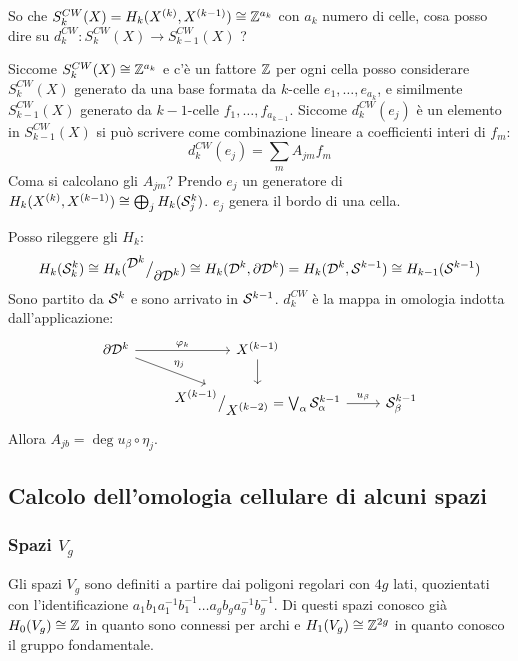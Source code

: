 \begin{osservation}
  So che $ S_k^{CW}(X) = H_k(X^{(k)}, X^{(k-1)}) \cong \mathbb{Z}^{a_k} $ con $ a_k $ numero di celle,
  cosa posso dire su $ d_k^{CW} \colon S_k^{CW}(X) \to S_{k-1}^{CW}(X) $ ?

  Siccome $ S_k^{CW}(X) \cong \mathbb{Z}^{a_k} $ e c'è un fattore $ \mathbb{Z} $ per ogni cella
  posso considerare $ S_k^{CW}(X) $ generato da una base formata da
  $ k $-celle $ e_1, \dots, e_{a_k} $, e similmente $ S_{k-1}^{CW}(X) $ generato
  da $ k - 1 $-celle $ f_1, \dots, f_{a_{k-1}} $. Siccome $ d_k^{CW}(e_j) $ è un elemento in
  $ S_{k-1}^{CW}(X) $ si può scrivere come combinazione lineare a coefficienti interi di $ f_m $:
  \[
    d^{CW}_k (e_j) = \sum_m A_{jm}f_m
  \]
  Coma si calcolano gli $ A_{jm} $?
  Prendo $ e_j $ un generatore di $ H_k(X^{(k)}, X^{(k-1)}) \cong \bigoplus_j H_k(\mathcal{S}^{k}_j) $.
  $ e_j $ genera il bordo di una cella.

  Posso rileggere gli $ H_k $:
  \[
    H_k(\mathcal{S}^{k}_k) \cong H_k({^{\textstyle \mathcal{D}^{k}}\big/_{\textstyle \partial \mathcal{D}^{k}}}) \cong H_k(\mathcal{D}^{k}, \partial \mathcal{D}^{k}) =
    H_k(\mathcal{D}^{k}, \mathcal{S}^{k-1}) \cong H_{k-1}(\mathcal{S}^{k-1})
  \]
  Sono partito da $ \mathcal{S}^{k} $ e sono arrivato in $ \mathcal{S}^{k-1} $.
  $ d_k^{CW} $ è la mappa in omologia indotta dall'applicazione:
  \[
    \begin{tikzcd}
      \partial \Disk{k} \rar{\phi_k} \arrow{dr}{\eta_j} & X^{(k-1)} \dar & {}\\
      {} & \quot{X^{(k-1)}}{X^{(k-2)}} = \bigvee_\alpha \Sph{k-1}_\alpha \rar{u_\beta} & \Sph{k-1}_\beta
    \end{tikzcd}
  \]
  Allora $ A_{jb} = \deg{u_\beta \circ \eta_j} $.
\end{osservation}


\subsection{Calcolo dell'omologia cellulare di alcuni spazi}

\subsubsection{Spazi $ V_g $}

Gli spazi $ V_g $ sono definiti a partire dai poligoni
regolari con $ 4g $ lati, quozientati con l'identificazione
$ a_1 b_1 a_1^{-1} b_1^{-1} \dots a_g b_g a_g^{-1} b_g^{-1} $.
Di questi spazi conosco già $ H_0(V_g) \cong \mathbb{Z} $ in quanto
sono connessi per archi e $ H_1(V_g) \cong \mathbb{Z}^{2g} $ in quanto
conosco il gruppo fondamentale.

